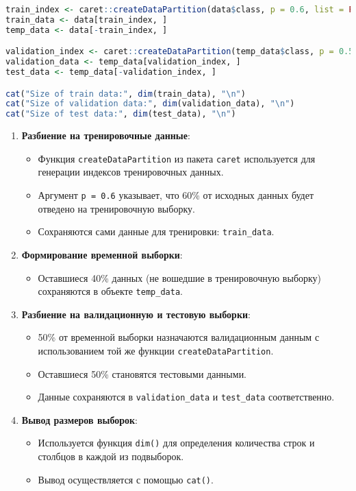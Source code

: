 \begin{lstlisting}[language=R, caption={Формирвание обучающей, валидационной и тестовой выборок}]
train_index <- caret::createDataPartition(data$class, p = 0.6, list = FALSE)
train_data <- data[train_index, ]
temp_data <- data[-train_index, ]

validation_index <- caret::createDataPartition(temp_data$class, p = 0.5, list = FALSE)
validation_data <- temp_data[validation_index, ]
test_data <- temp_data[-validation_index, ]

cat("Size of train data:", dim(train_data), "\n")
cat("Size of validation data:", dim(validation_data), "\n")
cat("Size of test data:", dim(test_data), "\n")
\end{lstlisting}

\begin{enumerate}
	\item \textbf{Разбиение на тренировочные данные}:
	\begin{itemize}
		\item Функция \texttt{createDataPartition} из пакета \texttt{caret} используется для генерации индексов тренировочных данных. 
		\item Аргумент \texttt{p = 0.6} указывает, что 60\% от исходных данных будет отведено на тренировочную выборку.
		\item Сохраняются сами данные для тренировки: \texttt{train\_data}.
	\end{itemize}
	
	\item \textbf{Формирование временной выборки}:
	\begin{itemize}
		\item Оставшиеся 40\% данных (не вошедшие в тренировочную выборку) сохраняются в объекте \texttt{temp\_data}.
	\end{itemize}
	
	\item \textbf{Разбиение на валидационную и тестовую выборки}:
	\begin{itemize}
		\item 50\% от временной выборки назначаются валидационным данным с использованием той же функции \texttt{createDataPartition}.
		\item Оставшиеся 50\% становятся тестовыми данными.
		\item Данные сохраняются в \texttt{validation\_data} и \texttt{test\_data} соответственно.
	\end{itemize}
	
	\item \textbf{Вывод размеров выборок}:
	\begin{itemize}
		\item Используется функция \texttt{dim()} для определения количества строк и столбцов в каждой из подвыборок.
		\item Вывод осуществляется с помощью \texttt{cat()}.
	\end{itemize}
\end{enumerate}

